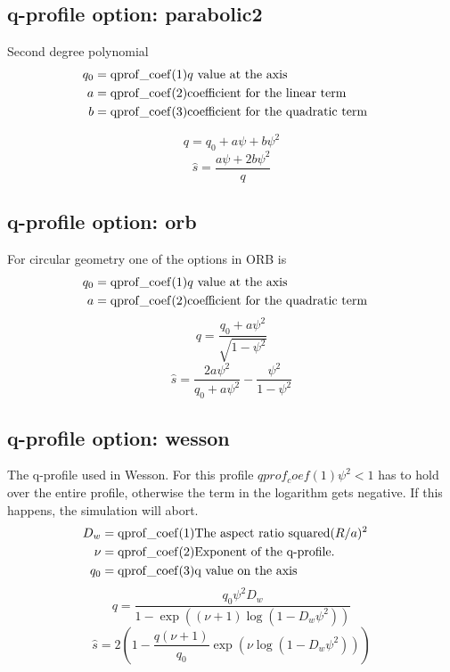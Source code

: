 \subsection{q-profile option: parabolic2} 

Second degree polynomial 
\begin{eqnarray*}
q_0    = {\rm qprof\_coef}(1)   &\hbox{$q$ value at the axis} \cr
a      = {\rm qprof\_coef}(2)   &\hbox{coefficient for the linear term}\cr
b      = {\rm qprof\_coef}(3)   &\hbox{coefficient for the quadratic term}
\end{eqnarray*}

\begin{equation}
q = q_0 + a \psi + b \psi^2 
\end{equation}
\begin{equation}
\hat s = \frac{a \psi + 2 b \psi^2}{q}
\end{equation}

\subsection{q-profile option: orb} 

For circular geometry one of the options in ORB is 
\begin{eqnarray*}
q_0    = {\rm qprof\_coef}(1)   &\hbox{$q$ value at the axis} \cr
a      = {\rm qprof\_coef}(2)   &\hbox{coefficient for the quadratic term}
\end{eqnarray*}
\begin{equation}
q = \frac{q_0 + a \psi^2}{\sqrt{1 - \psi^2}} 
\end{equation}
\begin{equation}
\hat s = \frac{2 a \psi^2 }{ q_0 + a \psi^2} - \frac{\psi^2 }{ 1 - \psi^2} 
\end{equation}

\subsection{q-profile option: wesson} 

The q-profile used in Wesson. For this profile $qprof_coef(1) \psi^2 < 1$ has to hold
over the entire profile, otherwise the term in the logarithm gets negative. 
If this happens, the simulation will abort.
\begin{eqnarray*}
D_w    = {\rm qprof\_coef}(1)   &\hbox{The aspect ratio squared}  (R/a)^{2} \cr
\nu    = {\rm qprof\_coef}(2)   &\hbox{Exponent of the q-profile.}\cr
q_0    = {\rm qprof\_coef}(3)   &\hbox{q value on the axis}\cr
\end{eqnarray*}
\begin{equation}
q = \frac{q_0 \psi^2 D_w }{ 1 - \exp((\nu+1)\log(1 - D_w \psi^2)) } 
\end{equation}
\begin{equation}
\hat s = 2 \left (1 - \frac{q(\nu + 1)}{q_0}\exp\left ( \nu \log(1-D_w \psi^2) \right) \right)
\end{equation}

